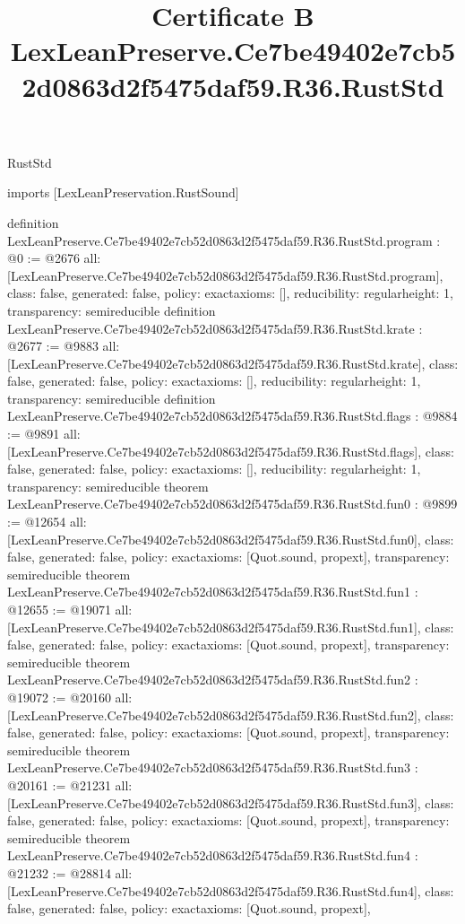 \begin{lexlean}{RustStd}
\title{Certificate B LexLeanPreserve.Ce7be49402e7cb52d0863d2f5475daf59.R36.RustStd}
\begin{coremodule}
imports [LexLeanPreservation.RustSound]

definition LexLeanPreserve.Ce7be49402e7cb52d0863d2f5475daf59.R36.RustStd.program : @0 := @2676 {
  all: [LexLeanPreserve.Ce7be49402e7cb52d0863d2f5475daf59.R36.RustStd.program],
  class: false,
  generated: false,
  policy: exact{axioms: []},
  reducibility: regular{height: 1},
  transparency: semireducible
}
definition LexLeanPreserve.Ce7be49402e7cb52d0863d2f5475daf59.R36.RustStd.krate : @2677 := @9883 {
  all: [LexLeanPreserve.Ce7be49402e7cb52d0863d2f5475daf59.R36.RustStd.krate],
  class: false,
  generated: false,
  policy: exact{axioms: []},
  reducibility: regular{height: 1},
  transparency: semireducible
}
definition LexLeanPreserve.Ce7be49402e7cb52d0863d2f5475daf59.R36.RustStd.flags : @9884 := @9891 {
  all: [LexLeanPreserve.Ce7be49402e7cb52d0863d2f5475daf59.R36.RustStd.flags],
  class: false,
  generated: false,
  policy: exact{axioms: []},
  reducibility: regular{height: 1},
  transparency: semireducible
}
theorem LexLeanPreserve.Ce7be49402e7cb52d0863d2f5475daf59.R36.RustStd.fun0 : @9899 := @12654 {
  all: [LexLeanPreserve.Ce7be49402e7cb52d0863d2f5475daf59.R36.RustStd.fun0],
  class: false,
  generated: false,
  policy: exact{axioms: [Quot.sound, propext]},
  transparency: semireducible
}
theorem LexLeanPreserve.Ce7be49402e7cb52d0863d2f5475daf59.R36.RustStd.fun1 : @12655 := @19071 {
  all: [LexLeanPreserve.Ce7be49402e7cb52d0863d2f5475daf59.R36.RustStd.fun1],
  class: false,
  generated: false,
  policy: exact{axioms: [Quot.sound, propext]},
  transparency: semireducible
}
theorem LexLeanPreserve.Ce7be49402e7cb52d0863d2f5475daf59.R36.RustStd.fun2 : @19072 := @20160 {
  all: [LexLeanPreserve.Ce7be49402e7cb52d0863d2f5475daf59.R36.RustStd.fun2],
  class: false,
  generated: false,
  policy: exact{axioms: [Quot.sound, propext]},
  transparency: semireducible
}
theorem LexLeanPreserve.Ce7be49402e7cb52d0863d2f5475daf59.R36.RustStd.fun3 : @20161 := @21231 {
  all: [LexLeanPreserve.Ce7be49402e7cb52d0863d2f5475daf59.R36.RustStd.fun3],
  class: false,
  generated: false,
  policy: exact{axioms: [Quot.sound, propext]},
  transparency: semireducible
}
theorem LexLeanPreserve.Ce7be49402e7cb52d0863d2f5475daf59.R36.RustStd.fun4 : @21232 := @28814 {
  all: [LexLeanPreserve.Ce7be49402e7cb52d0863d2f5475daf59.R36.RustStd.fun4],
  class: false,
  generated: false,
  policy: exact{axioms: [Quot.sound, propext]},
}
\end{coremodule}
\end{lexlean}
